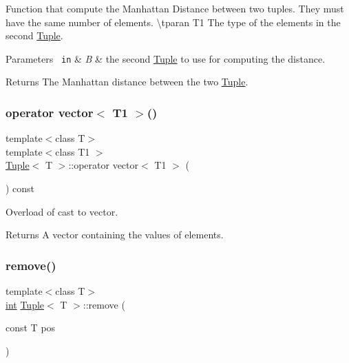 Function that compute the Manhattan Distance between two tuples. They must have the same number of elements. \textbackslash{}tparan T1 The type of the elements in the second \mbox{\hyperlink{class_tuple}{Tuple}}. 


\begin{DoxyParams}[1]{Parameters}
\mbox{\texttt{ in}}  & {\em B} & the second \mbox{\hyperlink{class_tuple}{Tuple}} to use for computing the distance. \\
\hline
\end{DoxyParams}
\begin{DoxyReturn}{Returns}
The Manhattan distance between the two \mbox{\hyperlink{class_tuple}{Tuple}}. 
\end{DoxyReturn}
\mbox{\label{class_tuple_a924a25df1578ffab148c69a1a1000491}} 
\subsubsection{\texorpdfstring{operator vector$<$ T1 $>$()}{operator vector< T1 >()}}
{\footnotesize\ttfamily template$<$class T$>$ \\
template$<$class T1 $>$ \\
\mbox{\hyperlink{class_tuple}{Tuple}}$<$ T $>$\+::operator vector$<$ T1 $>$ (\begin{DoxyParamCaption}{ }\end{DoxyParamCaption}) const\hspace{0.3cm}{\ttfamily [inline]}}



Overload of cast to vector. 

\begin{DoxyReturn}{Returns}
A vector containing the values of elements. 
\end{DoxyReturn}
\mbox{\label{class_tuple_a53a1abc3017d30cf1a6d6858caee8ce8}} 
\subsubsection{\texorpdfstring{remove()}{remove()}}
{\footnotesize\ttfamily template$<$class T$>$ \\
\mbox{\hyperlink{draw_8hh_aa620a13339ac3a1177c86edc549fda9b}{int}} \mbox{\hyperlink{class_tuple}{Tuple}}$<$ T $>$\+::remove (\begin{DoxyParamCaption}\item[{const T}]{pos }\end{DoxyParamCaption})\hspace{0.3cm}{\ttfamily [inline]}}



